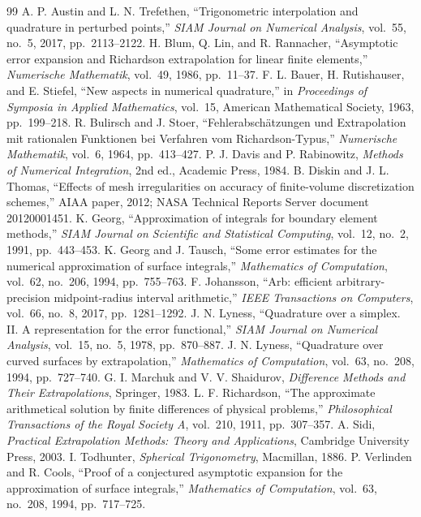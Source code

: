 \documentclass[11pt]{article}
\theoremstyle{remark}
\begin{document}
\begin{thebibliography}{99}
 A. P. Austin and L. N. Trefethen, ``Trigonometric interpolation and
quadrature in perturbed points,'' \emph{SIAM Journal on Numerical Analysis}, vol.~55, no.~5,
2017, pp.~2113--2122.
 H. Blum, Q. Lin, and R. Rannacher, ``Asymptotic error expansion and
Richardson extrapolation for linear finite elements,'' \emph{Numerische Mathematik}, vol.~49,
1986, pp.~11--37.
 F. L. Bauer, H. Rutishauser, and E. Stiefel, ``New aspects in numerical
quadrature,'' in \emph{Proceedings of Symposia in Applied Mathematics}, vol.~15, American
Mathematical Society, 1963, pp.~199--218.
 R. Bulirsch and J. Stoer, ``Fehlerabsch\"atzungen und Extrapolation
mit rationalen Funktionen bei Verfahren vom Richardson-Typus,'' \emph{Numerische Mathematik},
vol.~6, 1964, pp.~413--427.
 P. J. Davis and P. Rabinowitz, \emph{Methods of Numerical
Integration}, 2nd ed., Academic Press, 1984.
 B. Diskin and J. L. Thomas, ``Effects of mesh irregularities on accuracy
of finite-volume discretization schemes,'' AIAA paper, 2012; NASA Technical Reports Server
document 20120001451.
 K. Georg, ``Approximation of integrals for boundary element methods,''
\emph{SIAM Journal on Scientific and Statistical Computing}, vol.~12, no.~2, 1991,
pp.~443--453.
 K. Georg and J. Tausch, ``Some error estimates for the numerical
approximation of surface integrals,'' \emph{Mathematics of Computation}, vol.~62, no.~206,
1994, pp.~755--763.
 F. Johansson, ``Arb: efficient arbitrary-precision midpoint-radius interval
arithmetic,'' \emph{IEEE Transactions on Computers}, vol.~66, no.~8, 2017, pp.~1281--1292.
 J. N. Lyness, ``Quadrature over a simplex. II. A representation for the
error functional,'' \emph{SIAM Journal on Numerical Analysis}, vol.~15, no.~5, 1978,
pp.~870--887.
 J. N. Lyness, ``Quadrature over curved surfaces by extrapolation,''
\emph{Mathematics of Computation}, vol.~63, no.~208, 1994, pp.~727--740.
 G. I. Marchuk and V. V. Shaidurov, \emph{Difference Methods and
Their Extrapolations}, Springer, 1983.
 L. F. Richardson, ``The approximate arithmetical solution by finite
differences of physical problems,'' \emph{Philosophical Transactions of the Royal Society A},
vol.~210, 1911, pp.~307--357.
 A. Sidi, \emph{Practical Extrapolation Methods: Theory and Applications},
Cambridge University Press, 2003.
 I. Todhunter, \emph{Spherical Trigonometry}, Macmillan, 1886.
 P. Verlinden and R. Cools, ``Proof of a conjectured asymptotic
expansion for the approximation of surface integrals,'' \emph{Mathematics of Computation},
vol.~63, no.~208, 1994, pp.~717--725.
\end{thebibliography}
\end{document}
